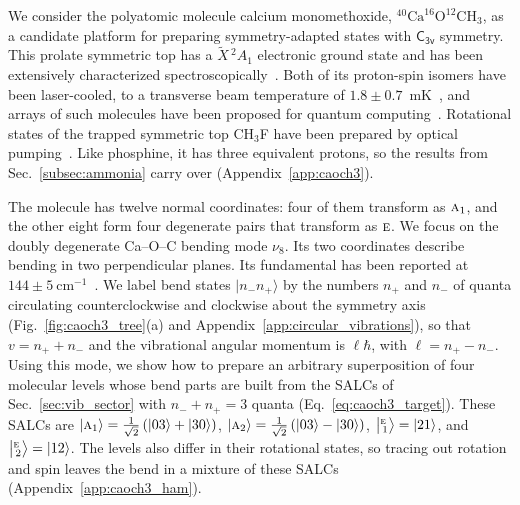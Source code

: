 \documentclass[
  reprint,
  aps,
  prx,
  superscriptaddress,
  amsmath,
  amssymb,
  longbibliography
]{revtex4-2}
\newcommand{\grp}[1]{\mathsf{#1}}
\newcommand{\irr}[1]{\text{\normalfont\scshape #1}}
\newcommand{\irket}[2]{\bigl\lvert{}^{#1}_{\,#2}\bigr\rangle}
\newcommand{\occ}[1]{\lvert #1\rangle}
\begin{document}
We consider the polyatomic molecule calcium monomethoxide, $^{40}\mathrm{Ca}^{16}\mathrm{O}^{12}\mathrm{CH}_3$, as a candidate platform for preparing symmetry-adapted states with $\grp{C_{3v}}$ symmetry. This prolate symmetric top has a $\widetilde X\,{}^2A_1$ electronic ground state and has been extensively characterized spectroscopically~\cite{Whitham1998,Namiki1998,Crozet2002}. Both of its proton-spin isomers have been laser-cooled, to a transverse beam temperature of $1.8\pm0.7$~mK~\cite{Mitra2020}, and arrays of such molecules have been proposed for quantum computing~\cite{Yu2019, Wei2011}. Rotational states of the trapped symmetric top CH$_3$F have been prepared by optical pumping~\cite{Glockner2015}. Like phosphine, it has three equivalent protons, so the results from Sec.~\ref{subsec:ammonia} carry over (Appendix~\ref{app:caoch3}).


The molecule has twelve normal coordinates: four of them transform as $\irr{a}_{1}$, and the other eight form four degenerate pairs that transform as $\irr{e}$. We focus on the doubly degenerate Ca--O--C bending mode $\nu_8$. Its two coordinates describe bending in two perpendicular planes. Its fundamental has been reported at $144\pm5\ \mathrm{cm^{-1}}$~\cite{Kozyryev2019}.  We label bend states $\occ{n_-n_+}$ by the numbers $n_+$ and $n_-$ of quanta circulating counterclockwise and clockwise about the symmetry axis (Fig.~\ref{fig:caoch3_tree}(a) and Appendix~\ref{app:circular_vibrations}), so that $v=n_++n_-$ and the vibrational angular momentum is $\ell\hbar$, with $\ell=n_+-n_-$. Using this mode, we show how to prepare an arbitrary superposition of four molecular levels whose bend parts are built from the SALCs of Sec.~\ref{sec:vib_sector} with $n_-+n_+=3$ quanta (Eq.~\eqref{eq:caoch3_target}). These SALCs are $\ket{\irr{a}_{1}}=\tfrac{1}{\sqrt{2}}\,(\occ{03}+\occ{30})$, $\ket{\irr{a}_{2}} =\tfrac{1}{\sqrt{2}}\,(\occ{03}-\occ{30})$, $\irket{\irr{e}}{1}=\occ{21}$, and $\irket{\irr{e}}{2}=\occ{12}$. The levels also differ in their rotational states, so tracing out rotation and spin leaves the bend in a mixture of these SALCs (Appendix~\ref{app:caoch3_ham}).
\end{document}

